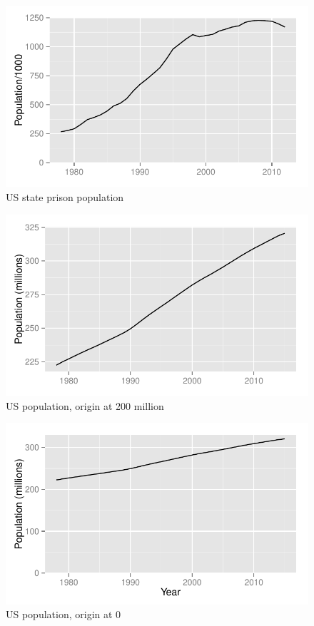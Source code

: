 \documentclass[letterpaper, landscape]{article}
\begin{document}
  \begin{figure}[H]
    \centering
    \includegraphics[scale = 0.8]{figures/prison_population_0_origin.pdf}
    \caption{US state prison population}\label{fig:prisonpop}
  \end{figure}

  \begin{figure}[H]
    \centering
    \includegraphics[scale = 0.8]{figures/us_population_200_origin.pdf}
    \caption{US population, origin at 200 million}\label{fig:uspop1}
  \end{figure}

  \begin{figure}[H]
    \centering
    \includegraphics[scale = 0.8]{figures/us_population_0_origin.pdf}
    \caption{US population, origin at 0}\label{fig:uspop2}
  \end{figure}
\end{document}
